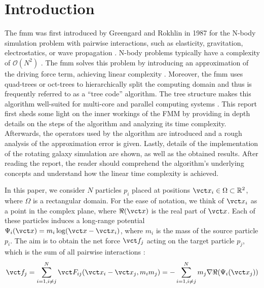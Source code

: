 \section{Introduction} \label{introduction}

The \gls{fmm} was first introduced by Greengard and Rokhlin in 1987 for the N-body simulation problem with pairwise interactions, such as elasticity, gravitation, electrostatics, or wave propagation \cite{Greengard1987AFA, Martinsson2015}.
N-body problems typically have a complexity of $\mathcal{O}(N^2)$ \cite{SicchaSeminar}.
The \gls{fmm} solves this problem by introducing an approximation of the driving force term, achieving linear complexity \cite{Martinsson2015}.
Moreover, the \gls{fmm} uses quad-trees or oct-trees to hierarchically split the computing domain and thus is frequently referred to as a ``tree code'' algorithm.
The tree structure makes this algorithm well-suited for multi-core and parallel computing systems \cite{Martinsson2015}.
This report first sheds some light on the inner workings of the FMM by providing in depth details on the steps of the algorithm and analyzing its time complexity.
Afterwards, the operators used by the algorithm are introduced and a rough analysis of the approximation error is given.
Lastly, details of the implementation of the rotating galaxy simulation are shown, as well as the obtained results.
After reading the report, the reader should comprehend the algorithm’s underlying concepts and understand how the linear time complexity is achieved.

In this paper, we consider $N$ particles $p_i$ placed at positions $\vct x_i \in \Omega \subset \mathbb{R}^2$, where $\Omega$ is a rectangular domain.
For the ease of notation, we think of $\vct x_i$ as a point in the complex plane, where $\Re(\vct x)$ is the real part of $\vct x$.
Each of these particles induces a long-range potential $\Psi_i(\vct x) = m_i \log(\vct x - \vct x_i)$, where $m_i$ is the mass of the source particle $p_i$.
The aim is to obtain the net force $\vct f_j$ acting on the target particle $p_j$, which is the sum of all pairwise interactions \cite{short-course}:
\begin{equation}
  \vct f_j = \sum_{i=1, i\neq j}^N \vct F_{ij}(\vct x_i - \vct x_j, m_i m_j)
      = -\sum_{i=1, i\neq j}^N m_j \nabla \Re(\Psi_i(\vct x_j))
  \label{equ:force}
\end{equation}
